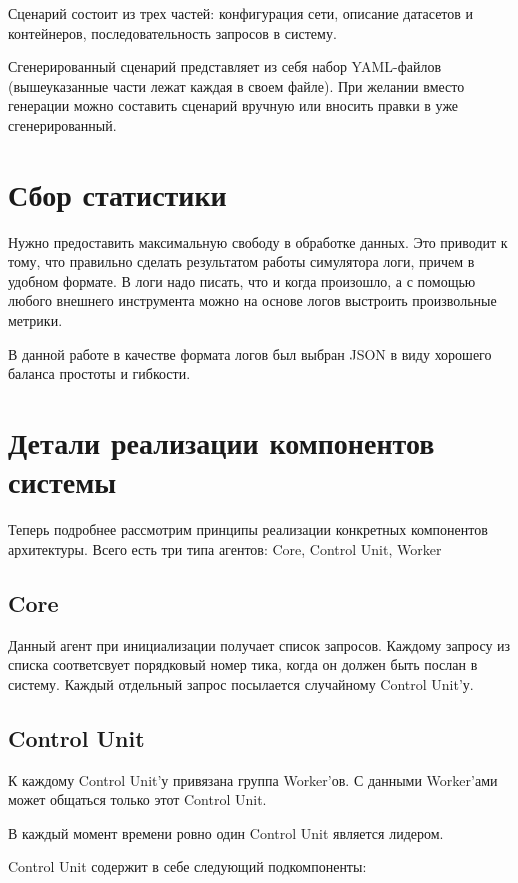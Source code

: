 Сценарий состоит из трех частей: конфигурация сети, описание датасетов и контейнеров, последовательность запросов в систему.

Сгенерированный сценарий представляет из себя набор YAML-файлов (вышеуказанные части лежат каждая в своем файле). При желании вместо генерации можно составить сценарий вручную или вносить правки в уже сгенерированный.

\section{Сбор статистики}

Нужно предоставить максимальную свободу в обработке данных. Это приводит к тому, что правильно сделать результатом работы симулятора логи, причем в удобном формате. В логи надо писать, что и когда произошло, а с помощью любого внешнего инструмента можно на основе логов выстроить произвольные метрики.

В данной работе в качестве формата логов был выбран JSON в виду хорошего баланса простоты и гибкости.

\section{Детали реализации компонентов системы}

Теперь подробнее рассмотрим принципы реализации конкретных компонентов архитектуры. Всего есть три типа агентов: Core, Control Unit, Worker

\subsection{Core}

Данный агент при инициализации получает список запросов. Каждому запросу из списка соответсвует порядковый номер тика, когда он должен быть послан в систему. Каждый отдельный запрос посылается случайному Control Unit'у.

\subsection{Control Unit}

К каждому Control Unit'у привязана группа Worker'ов. С данными Worker'ами может общаться только этот Control Unit.

В каждый момент времени ровно один Control Unit является лидером.

Control Unit содержит в себе следующий подкомпоненты:

